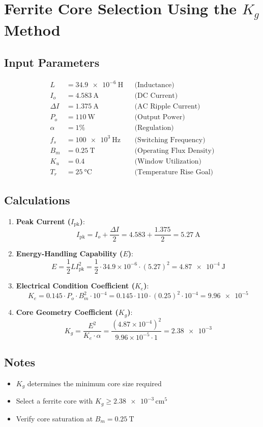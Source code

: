 \documentclass{article}
\begin{document}
\section*{Ferrite Core Selection Using the \( K_g \) Method}

\subsection*{Input Parameters}
\begin{align*}
L &= \SI{34.9e-6}{\henry} & &\text{(Inductance)} \\
I_o &= \SI{4.583}{\ampere} & &\text{(DC Current)} \\
\Delta I &= \SI{1.375}{\ampere} & &\text{(AC Ripple Current)} \\
P_o &= \SI{110}{\watt} & &\text{(Output Power)} \\
\alpha &= 1\% & &\text{(Regulation)} \\
f_s &= \SI{100e3}{\hertz} & &\text{(Switching Frequency)} \\
B_m &= \SI{0.25}{\tesla} & &\text{(Operating Flux Density)} \\
K_u &= 0.4 & &\text{(Window Utilization)} \\
T_r &= \SI{25}{\celsius} & &\text{(Temperature Rise Goal)}
\end{align*}

\subsection*{Calculations}
\begin{enumerate}
\item \textbf{Peak Current (\( I_{\text{pk}} \))}:
\[
I_{\text{pk}} = I_o + \frac{\Delta I}{2} = 4.583 + \frac{1.375}{2} = \SI{5.27}{\ampere}
\]

\item \textbf{Energy-Handling Capability (\( E \))}:
\[
E = \frac{1}{2} L I_{\text{pk}}^2 = \frac{1}{2} \cdot 34.9 \times 10^{-6} \cdot (5.27)^2 = \SI{4.87e-4}{\joule}
\]

\item \textbf{Electrical Condition Coefficient (\( K_e \))}:
\[
K_e = 0.145 \cdot P_o \cdot B_m^2 \cdot 10^{-4} = 0.145 \cdot 110 \cdot (0.25)^2 \cdot 10^{-4} = \num{9.96e-5}
\]

\item \textbf{Core Geometry Coefficient (\( K_g \))}:
\[
K_g = \frac{E^2}{K_e \cdot \alpha} = \frac{(4.87 \times 10^{-4})^2}{9.96 \times 10^{-5} \cdot 1} = \num{2.38e-3}
\]
\end{enumerate}

\subsection*{Notes}
\begin{itemize}
\item \( K_g \) determines the minimum core size required
\item Select a ferrite core with \( K_g \geq \num{2.38e-3} \, \text{cm}^5 \)
\item Verify core saturation at \( B_m = \SI{0.25}{\tesla} \)
\end{itemize}
\end{document}
